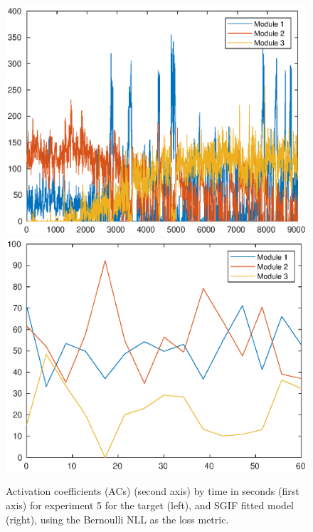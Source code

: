 \documentclass[mphil,deptreport,ianc]{infthesis} %
\begin{document}
\begin{figure}
    \centering
    \vspace{-0.1in}
    \includegraphics[width=0.8\columnwidth]{figures/sleep/ACs138.eps}
    \vspace{-0.1in}
    \includegraphics[width=0.65\columnwidth]{figures/sleep/ACs_SGIF_exp5_fit_bernoulli_nll_2.eps}
    \vspace{-0.1in}
    \caption{Activation coefficients (ACs) (second axis) by time in seconds (first axis) for experiment 5 for the target (left), and SGIF fitted model (right), using the Bernoulli NLL as the loss metric.}
    \label{fig:ACs_exp5}
\end{figure}
\end{document}

